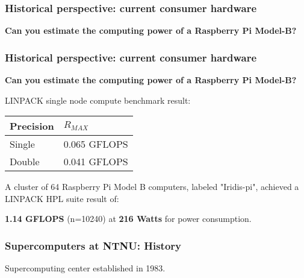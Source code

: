 \begin{frame}
  \frametitle{Historical perspective: current consumer hardware}


\textbf{Can you estimate the computing power of a Raspberry Pi Model-B?}
\end{frame}


\begin{frame}
  \frametitle{Historical perspective: current consumer hardware}


\textbf{Can you estimate the computing power of a Raspberry Pi Model-B?}
\begin{center}

\vspace{2em}
LINPACK single node compute benchmark result:

\vspace{2em}
\begin{tabular}{|l|l|}
\hline
Precision &  $R_{MAX}$  \\
\hline
Single    &  0.065 GFLOPS  \\
Double    &  0.041 GFLOPS  \\
\hline
\end{tabular}
\end{center}

\vspace{2em}
A cluster of 64 Raspberry Pi Model B computers, labeled "Iridis-pi", achieved a LINPACK HPL suite result of:
\begin{center}
\textbf{1.14 GFLOPS} (n=10240) at \textbf{216 Watts} for power consumption.
\end{center}
\end{frame}


\begin{frame}
  \frametitle{Supercomputers at NTNU: History}

Supercomputing center established in 1983.
  \begin{center}
    \scalebox{0.8}{
      
    }
  \end{center}
\end{frame}

